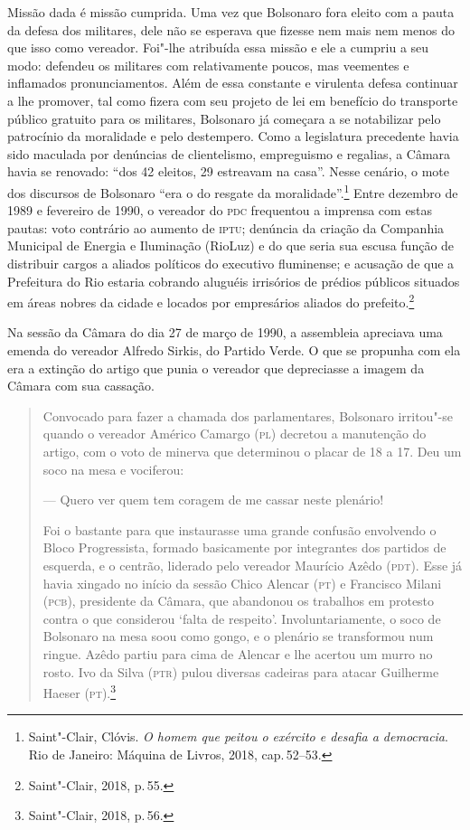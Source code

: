 Missão dada é missão cumprida. Uma vez que Bolsonaro fora eleito com a
pauta da defesa dos militares, dele não se esperava que fizesse nem mais
nem menos do que isso como vereador. Foi"-lhe atribuída essa missão e ele
a cumpriu a seu modo: defendeu os militares com relativamente poucos,
mas veementes e inflamados pronunciamentos. Além de essa constante e
virulenta defesa continuar a lhe promover, tal como fizera com seu
projeto de lei em benefício do transporte público gratuito para os
militares, Bolsonaro já começara a se notabilizar pelo patrocínio da
moralidade e pelo destempero. Como a legislatura precedente havia sido
maculada por denúncias de clientelismo, empreguismo e regalias, a Câmara
havia se renovado: ``dos 42 eleitos, 29 estreavam na casa''. Nesse
cenário, o mote dos discursos de Bolsonaro ``era o do resgate da
moralidade''.\footnote{Saint"-Clair, Clóvis. \emph{O homem que peitou o
  exército e desafia a democracia}. Rio de Janeiro: Máquina de Livros,
  2018, cap.\,52--53.} Entre dezembro de 1989 e fevereiro de 1990, o
vereador do \textsc{pdc} frequentou a imprensa com estas pautas: voto contrário
ao aumento de \textsc{iptu}; denúncia da criação da Companhia Municipal de
Energia e Iluminação (RioLuz) e do que seria sua escusa função de
distribuir cargos a aliados políticos do executivo fluminense; e
acusação de que a Prefeitura do Rio estaria cobrando aluguéis irrisórios
de prédios públicos situados em áreas nobres da cidade e locados por
empresários aliados do prefeito.\footnote{Saint"-Clair, 2018, p.\,55.}

Na sessão da Câmara do dia 27 de março de 1990, a assembleia apreciava
uma emenda do vereador Alfredo Sirkis, do Partido Verde. O que se
propunha com ela era a extinção do artigo que punia o vereador que
depreciasse a imagem da Câmara com sua cassação.

\begin{quote}
Convocado para fazer a chamada dos parlamentares, Bolsonaro irritou"-se
quando o vereador Américo Camargo (\textsc{pl}) decretou a manutenção do artigo,
com o voto de minerva que determinou o placar de 18 a 17. Deu um soco na
mesa e vociferou:

--- Quero ver quem tem coragem de me cassar neste plenário!

Foi o bastante para que instaurasse uma grande confusão envolvendo o
Bloco Progressista, formado basicamente por integrantes dos partidos de
esquerda, e o centrão, liderado pelo vereador Maurício Azêdo (\textsc{pdt}). Esse
já havia xingado no início da sessão Chico Alencar (\textsc{pt}) e Francisco
Milani (\textsc{pcb}), presidente da Câmara, que abandonou os trabalhos em
protesto contra o que considerou `falta de respeito'. Involuntariamente,
o soco de Bolsonaro na mesa soou como gongo, e o plenário se transformou
num ringue. Azêdo partiu para cima de Alencar e lhe acertou um murro no
rosto. Ivo da Silva (\textsc{ptr}) pulou diversas cadeiras para atacar Guilherme
Haeser (\textsc{pt}).\footnote{Saint"-Clair, 2018, p.\,56.}
\end{quote}

